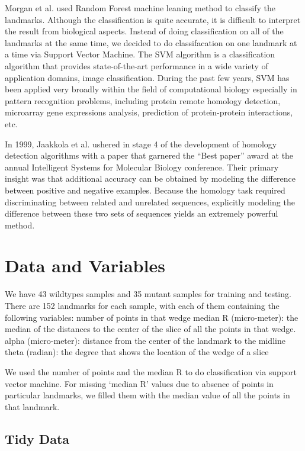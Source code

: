 \documentclass[10pt,letterpaper]{article}
\begin{document}
Morgan et al. used Random Forest machine leaning method to classify the
landmarks. Although the classification is quite accurate, it is
difficult to interpret the result from biological aspects. Instead of
doing classification on all of the landmarks at the same time, we
decided to do classifacation on one landmark at a time via Support
Vector Machine. The SVM algorithm is a classification algorithm that
provides state-of-the-art performance in a wide variety of application
domains, image classification. During the past few years, SVM has been
applied very broadly within the field of computational biology
especially in pattern recognition problems, including protein remote
homology detection, microarray gene expressions analysis, prediction of
protein-protein interactions, etc.

In 1999, Jaakkola et al. ushered in stage 4 of the development of
homology detection algorithms with a paper that garnered the ``Best
paper'' award at the annual Intelligent Systems for Molecular Biology
conference. Their primary insight was that additional accuracy can be
obtained by modeling the difference between positive and negative
examples. Because the homology task required discriminating between
related and unrelated sequences, explicitly modeling the difference
between these two sets of sequences yields an extremely powerful method.

\section{Data and Variables}\label{data-and-variables}

We have 43 wildtypes samples and 35 mutant samples for training and
testing. There are 152 landmarks for each sample, with each of them
containing the following variables: number of points in that wedge
median R (micro-meter): the median of the distances to the center of the
slice of all the points in that wedge. alpha (micro-meter): distance
from the center of the landmark to the midline theta (radian): the
degree that shows the location of the wedge of a slice

We used the number of points and the median R to do classification via
support vector machine. For missing `median R' values due to absence of
points in particular landmarks, we filled them with the median value of
all the points in that landmark.

\subsection{Tidy Data}\label{tidy-data}
\end{document}
